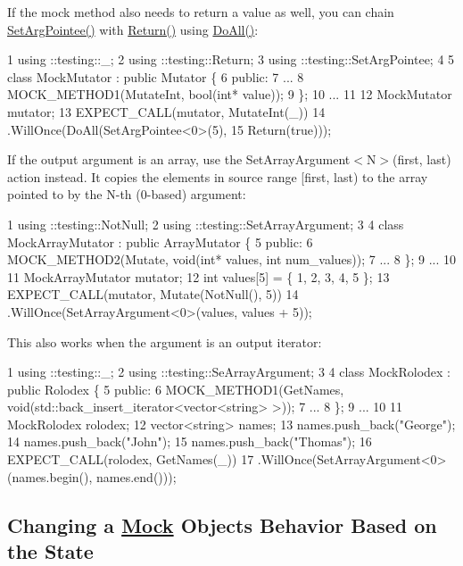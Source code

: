 If the mock method also needs to return a value as well, you can chain {\ttfamily \hyperlink{namespacetesting_a5740a5033b88c37666fcd09a269d123f}{Set\+Arg\+Pointee()}} with {\ttfamily \hyperlink{namespacetesting_af6d1c13e9376c77671e37545cd84359c}{Return()}} using {\ttfamily \hyperlink{namespacetesting_a5f533932753d2af95000e96c4a3042e3}{Do\+All()}}\+:


\begin{DoxyCode}
1 using ::testing::\_;
2 using ::testing::Return;
3 using ::testing::SetArgPointee;
4 
5 class MockMutator : public Mutator \{
6  public:
7   ...
8   MOCK\_METHOD1(MutateInt, bool(int* value));
9 \};
10 ...
11 
12   MockMutator mutator;
13   EXPECT\_CALL(mutator, MutateInt(\_))
14       .WillOnce(DoAll(SetArgPointee<0>(5),
15                       Return(true)));
\end{DoxyCode}


If the output argument is an array, use the {\ttfamily Set\+Array\+Argument$<$N$>$(first, last)} action instead. It copies the elements in source range {\ttfamily \mbox{[}first, last)} to the array pointed to by the {\ttfamily N}-\/th (0-\/based) argument\+:


\begin{DoxyCode}
1 using ::testing::NotNull;
2 using ::testing::SetArrayArgument;
3 
4 class MockArrayMutator : public ArrayMutator \{
5  public:
6   MOCK\_METHOD2(Mutate, void(int* values, int num\_values));
7   ...
8 \};
9 ...
10 
11   MockArrayMutator mutator;
12   int values[5] = \{ 1, 2, 3, 4, 5 \};
13   EXPECT\_CALL(mutator, Mutate(NotNull(), 5))
14       .WillOnce(SetArrayArgument<0>(values, values + 5));
\end{DoxyCode}


This also works when the argument is an output iterator\+:


\begin{DoxyCode}
1 using ::testing::\_;
2 using ::testing::SeArrayArgument;
3 
4 class MockRolodex : public Rolodex \{
5  public:
6   MOCK\_METHOD1(GetNames, void(std::back\_insert\_iterator<vector<string> >));
7   ...
8 \};
9 ...
10 
11   MockRolodex rolodex;
12   vector<string> names;
13   names.push\_back("George");
14   names.push\_back("John");
15   names.push\_back("Thomas");
16   EXPECT\_CALL(rolodex, GetNames(\_))
17       .WillOnce(SetArrayArgument<0>(names.begin(), names.end()));
\end{DoxyCode}


\subsection*{Changing a \hyperlink{class_mock}{Mock} Object\textquotesingle{}s Behavior Based on the State}

